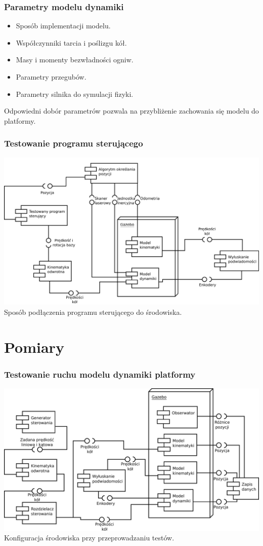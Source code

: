 \documentclass{beamer}
\begin{document}
	\begin{frame}
		\frametitle{Parametry modelu dynamiki}
		\begin{itemize}
			\item Sposób implementacji modelu.
			\item Współczynniki tarcia i poślizgu kół.
			\item Masy i momenty bezwładności ogniw.
			\item Parametry przegubów.
			\item Parametry silnika do symulacji fizyki.
		\end{itemize}
		Odpowiedni dobór parametrów pozwala na przybliżenie zachowania się modelu do platformy.

	\end{frame}

	\begin{frame}
		\frametitle{Testowanie programu sterującego}
		\centering
		\includegraphics[width=\textwidth]{graphics/final.pdf} 
		Sposób podłączenia programu sterującego do środowiska.
	\end{frame}
	
	
	
	\section{Pomiary}
	\begin{frame}
		\frametitle{Testowanie ruchu modelu dynamiki platformy}
		\centering
		\includegraphics[width=\textwidth]{graphics/comparison.pdf} 
		Konfiguracja środowiska przy przeprowadzaniu testów.
	\end{frame}
	
\end{document}
